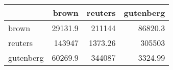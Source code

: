 \begin{tabular}{lrrr}
\hline
           &    brown &   reuters &   gutenberg \\
\hline
 brown     &  29131.9 & 211144    &    86820.3  \\
 reuters   & 143947   &   1373.26 &   305503    \\
 gutenberg &  60269.9 & 344087    &     3324.99 \\
\hline
\end{tabular}
